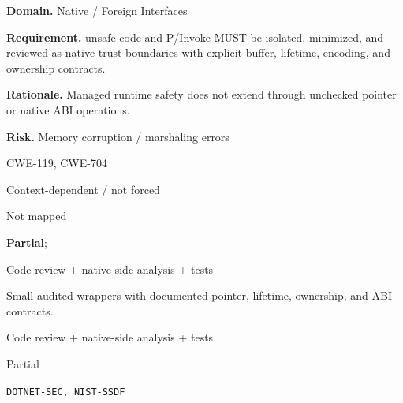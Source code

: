 \documentclass[10pt,letterpaper]{article}
\newcommand{\prioritybadge}[2]{\tcbox[on line,boxrule=0pt,arc=1.2mm,boxsep=0.7mm,left=1mm,right=1mm,top=0.4mm,bottom=0.4mm,colback=#2!12,coltext=#2]{\scriptsize\bfseries #1}}
\begin{document}
\begin{rulebox}[title={\texttt{SCS-CSHARP-FFI-001} \hfill \prioritybadge{Critical Control}{Critical}}]
\textbf{Domain.} Native / Foreign Interfaces

\textbf{Requirement.} unsafe code and P/Invoke MUST be isolated, minimized, and reviewed as native trust boundaries with explicit buffer, lifetime, encoding, and ownership contracts.

\textbf{Rationale.} Managed runtime safety does not extend through unchecked pointer or native ABI operations.

\textbf{Risk.} Memory corruption / marshaling errors

\begin{description}[leftmargin=2.65cm,labelwidth=2.3cm,style=nextline,itemsep=1pt,topsep=3pt]
  \item[CWE] CWE-119, CWE-704
  \item[OWASP] Context-dependent / not forced
  \item[CERT] Not mapped
  \item[CodeQL] \textbf{Partial}; ---
  \item[Enforcement] Code review + native-side analysis + tests
  \item[Prevention] Small audited wrappers with documented pointer, lifetime, ownership, and ABI contracts.
  \item[Verification] Code review + native-side analysis + tests
  \item[Automation] Partial
  \item[Sources] \texttt{DOTNET-SEC, NIST-SSDF}
\end{description}
\end{rulebox}
\end{document}
